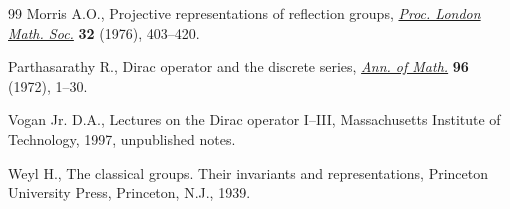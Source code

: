 \begin{thebibliography}{99}
Morris A.O., Projective representations of reflection groups, \href{https://doi.org/10.1112/plms/s3-32.3.403}{\textit{Proc.
 London Math. Soc.}} \textbf{32} (1976), 403--420.

Parthasarathy R., Dirac operator and the discrete series, \href{https://doi.org/10.2307/1970892}{\textit{Ann. of
 Math.}} \textbf{96} (1972), 1--30.

Vogan Jr. D.A., Lectures on the {D}irac operator {I}--{III}, {M}assachusetts
 Institute of Technology, 1997, unpublished notes.

Weyl H., The classical groups. {T}heir invariants and representations,
 Princeton University Press, Princeton, N.J., 1939.

\end{thebibliography}
